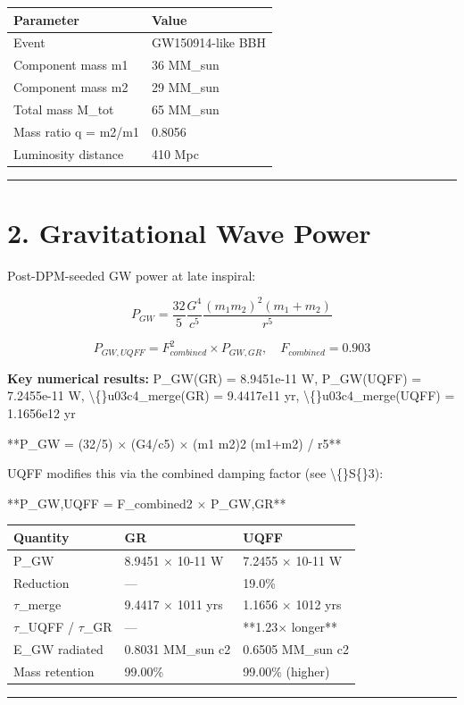 \documentclass[11pt]{article}
\begin{document}
\begin{center}
\begin{longtable}{ll}
\toprule
Parameter & Value \tabularnewline
\midrule
\endhead
Event & GW150914-like BBH \tabularnewline
Component mass m1 & 36 MM\_sun \tabularnewline
Component mass m2 & 29 MM\_sun \tabularnewline
Total mass M\_tot & 65 MM\_sun \tabularnewline
Mass ratio q = m2/m1 & 0.8056 \tabularnewline
Luminosity distance & 410 Mpc \tabularnewline
\bottomrule
\end{longtable}
\end{center}

\noindent\rule{\textwidth}{0.4pt}

\section*{2. Gravitational Wave Power}

Post-DPM-seeded GW power at late inspiral:

$$P_{GW} = \frac{32}{5}\frac{G^4}{c^5}\frac{(m_1 m_2)^2(m_1+m_2)}{r^5}$$

$$P_{GW,UQFF} = F_{combined}^2 \times P_{GW,GR},\quad F_{combined} = 0.903$$

\textbf{Key numerical results:} P\_GW(GR) = 8.9451e-11 W, P\_GW(UQFF) = 7.2455e-11 W, \textbackslash\{\}u03c4\_merge(GR) = 9.4417e11 yr, \textbackslash\{\}u03c4\_merge(UQFF) = 1.1656e12 yr

**P\_GW = (32/5) $\times$ (G4/c5) $\times$ (m1 m2)2 (m1+m2) / r5**

UQFF modifies this via the combined damping factor (see \textbackslash\{\}S\{\}3):

**P\_GW,UQFF = F\_combined2 $\times$ P\_GW,GR**

\begin{center}
\begin{longtable}{lll}
\toprule
Quantity & GR & UQFF \tabularnewline
\midrule
\endhead
P\_GW & 8.9451 $\times$ 10-11 W & 7.2455 $\times$ 10-11 W \tabularnewline
Reduction & --- & 19.0\% \tabularnewline
$\tau$\_merge & 9.4417 $\times$ 1011 yrs & 1.1656 $\times$ 1012 yrs \tabularnewline
$\tau$\_UQFF / $\tau$\_GR & --- & **1.23$\times$ longer** \tabularnewline
E\_GW radiated & 0.8031 MM\_sun c2 & 0.6505 MM\_sun c2 \tabularnewline
Mass retention & 99.00\% & 99.00\% (higher) \tabularnewline
\bottomrule
\end{longtable}
\end{center}

\noindent\rule{\textwidth}{0.4pt}
\end{document}
